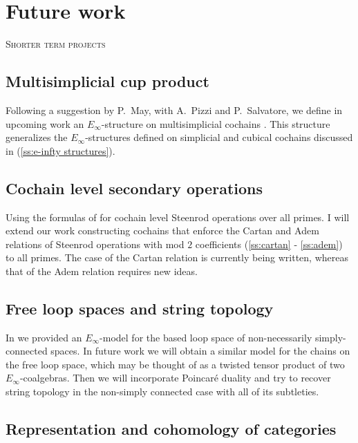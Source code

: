 
\section{Future work} \label{s:future}

\noindent \textsc{Shorter term projects}

\subsection{Multisimplicial cup product}

Following a suggestion by P.~May, with A.~Pizzi and P.~Salvatore, we define in upcoming work an $E_\infty$-structure on multisimplicial cochains \cite{medina2021multisimplicial}.
This structure generalizes the $E_\infty$-structures defined on simplicial and cubical cochains discussed in (\cref{ss:e-infty structures}).

\subsection{Cochain level secondary operations}

Using the formulas of \cite{medina2021maysteenrod} for cochain level Steenrod operations over all primes.
I will extend our work constructing cochains that enforce the Cartan and Adem relations of Steenrod operations with mod $2$ coefficients (\cref{ss:cartan} - \cref{ss:adem}) to all primes.
The case of the Cartan relation is currently being written, whereas that of the Adem relation requires new ideas.

\subsection{Free loop spaces and string topology}

In \cite{medina2021cobar} we provided an $E_\infty$-model for the based loop space of non-necessarily simply-connected spaces.
In future work we will obtain a similar model for the chains on the free loop space, which may be thought of as a twisted tensor product of two $E_\infty$-coalgebras.
Then we will incorporate Poincar\'{e} duality and try to recover string topology in the non-simply connected case with all of its subtleties.

\subsection{Representation and cohomology of categories}

